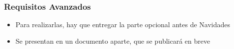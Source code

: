 \documentclass{beamer}
\begin{document}
%
%
%


\begin{frame}
\frametitle{Requisitos Avanzados}

\begin{itemize}
  \item Para realizarlas, hay que entregar la parte opcional antes de Navidades
  \item Se presentan en un documento aparte, que se publicará en breve
\end{itemize}

\end{frame}




\frame{
\maketitle
}
\end{document}
